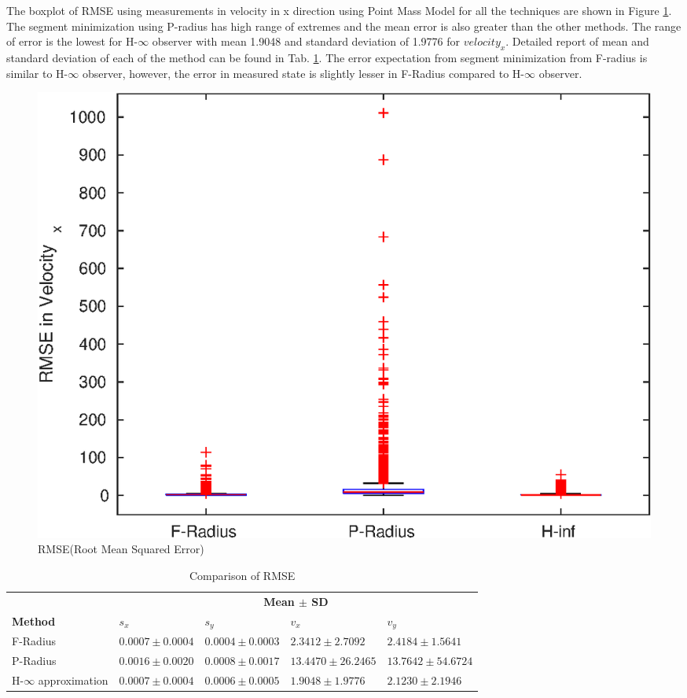 The boxplot of RMSE using measurements in velocity in x direction using Point Mass Model for all the techniques are shown in Figure \ref{fig:boxplot}. The segment minimization using P-radius has high range of extremes and the mean error is also greater than the other methods. The range of error is the lowest for H-$\infty$ observer with mean 
1.9048 and standard deviation of 1.9776 for $velocity_x$. Detailed report of mean and standard deviation of each of the method can be found in Tab. \ref{tab:errormean}. The error expectation from segment minimization from F-radius is similar to H-$\infty$ observer, however, the error in measured state is slightly lesser in F-Radius compared to H-$\infty$ observer.
\begin{figure}[h]
\centering
\includegraphics[width=\linewidth]{figures/Error/boxplotall}
\caption{RMSE(Root Mean Squared Error)}
\label{fig:boxplot}
\end{figure}

\begin{table}[htbp]
\caption{Comparison of RMSE}
	\centering
	\renewcommand{\arraystretch}{1.1}
	\small	
	\begin{tabular}{l l l l l}
		\toprule 
		& \multicolumn{4}{c}{\textbf{Mean $\pm$ SD}} \\ \cmidrule{2-5}
		\textbf{Method} & \textbf{$s_x$} & \textbf{$s_y$} & \textbf{$v_x$} & \textbf{$v_y$}\\ \midrule
		F-Radius & $0.0007\pm 0.0004$ &  $0.0004  \pm 0.0003$ &  $2.3412 \pm 2.7092$ &   $2.4184 \pm 1.5641$ \\
		P-Radius & $0.0016 \pm 0.0020$ &   $0.0008 \pm 0.0017$  & $13.4470 \pm 26.2465$ &  $13.7642 \pm 54.6724$\\
		H-$\infty$ approximation & $0.0007 \pm 0.0004$ &  $0.0006 \pm 0.0005$   & $1.9048 \pm  1.9776$  &  $ 2.1230 \pm  2.1946$\\
		\bottomrule
	\end{tabular}
	\label{tab:errormean}
\end{table}

